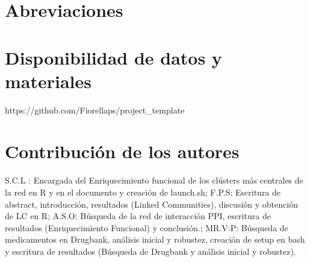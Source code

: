 \documentclass{bmcart}
\begin{document}
	
	
	
	
	
	
	
	
	
	\begin{backmatter}
	\newpage
		\section*{Abreviaciones}%
			
		
		\section*{Disponibilidad de datos y materiales}%
			https://github.com/Fiorellaps/project\_template
		
		\section*{Contribución de los autores}
			S.C.L : Encargada del Enriquecimiento funcional de los clústers más centrales de la red en R y en el documento y creación de launch.sh; F.P.S: Escritura de abstract, introducción, resultados (Linked Communities), discusión y obtención de LC en R; A.S.O: Búsqueda de la red de interacción PPI, escritura de resultados (Enriquecimiento Funcional) y conclusión.; MR.V:P: Búsqueda de medicamentos en Drugbank, análisis inicial y robustez, creación de setup en bash y escritura de resultados (Búsqueda de Drugbank y análisis inicial y robustez).
		
		
		

		 \typeout{}     
         
         \nocite{*}
	\end{backmatter}
\end{document}
